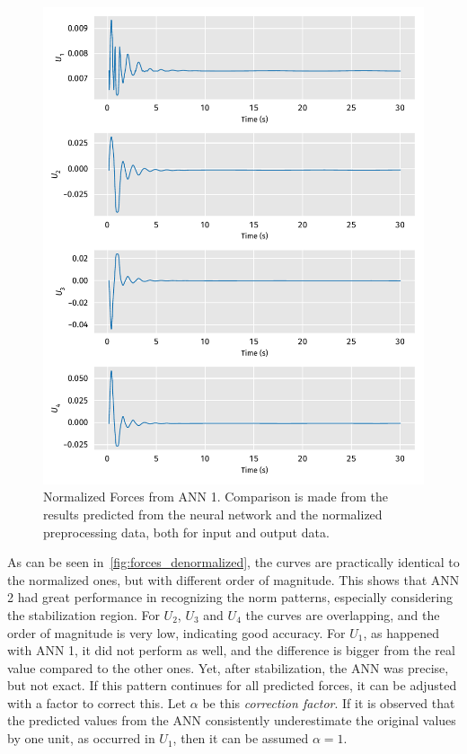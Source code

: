 \begin{figure}[!htb]
    \centering
    \caption[Normalized Forces from ANN 1]{Normalized Forces from ANN 1. Comparison is made from the results predicted from the neural network and the normalized preprocessing data, both for input and output data.}
    \includegraphics{../codes/figures/normalized_forces.pdf}

    \label{fig:forces_normalized}
\end{figure}

As can be seen in~\cref{fig:forces_denormalized}, the curves are practically identical to the normalized ones, but with different order of magnitude.
This shows that ANN 2 had great performance in recognizing the norm patterns, especially considering the stabilization region.
For \(U_2\), \(U_3\) and \(U_4\) the curves are overlapping, and the order of magnitude is very low, indicating good accuracy.
For \(U_1\), as happened with ANN 1, it did not perform as well, and the difference is bigger from the real value compared to the other ones. Yet, after stabilization, the ANN was precise, but not exact. 
If this pattern continues for all predicted forces, it can be adjusted with a factor to correct this.
Let \(\alpha\) be this \emph{correction factor}. 
If it is observed that the predicted values from the ANN consistently underestimate the original values by one unit, as occurred in \(U_1\), then it can be assumed \(\alpha = 1\).

